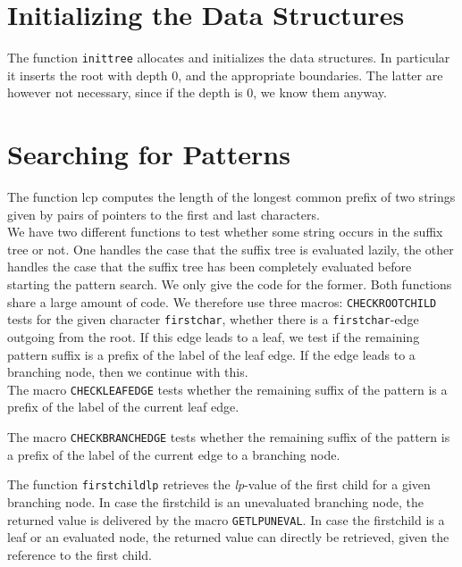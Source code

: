\documentclass[a4paper]{article}
\begin{document}
\section{Initializing the Data Structures}

The function \texttt{inittree} allocates and initializes the data structures.
In particular it inserts the root with depth 0, and the appropriate boundaries.
The latter are however not necessary, since if the depth is 0, we know them
anyway.

\section{Searching for Patterns}

The function lcp computes the length of the longest common prefix of two
strings given by pairs of pointers to the first and last characters.\\

We have two different functions to test whether some string occurs in the
suffix tree or not. One handles the case that the suffix tree is evaluated
lazily, the other handles the case that the suffix tree has been completely
evaluated before starting the pattern search. We only give the code for the
former. Both functions share a large amount of code. We therefore use three
macros: \texttt{CHECKROOTCHILD} tests for the given character
\texttt{firstchar}, whether there is a \texttt{firstchar}-edge outgoing from
the root. If this edge leads to a leaf, we test if the remaining pattern
suffix is a prefix of the label of the leaf edge. If the edge leads to a
branching node, then we continue with this.\\

The macro \texttt{CHECKLEAFEDGE} tests whether the remaining suffix of the
pattern is a prefix of the label of the current leaf edge.


The macro \texttt{CHECKBRANCHEDGE} tests whether the remaining suffix of the
pattern is a prefix of the label of the current edge to a branching node.

The function \texttt{firstchildlp} retrieves the \emph{lp}-value of the first child
for a given branching node. In case the firstchild is an unevaluated
branching node, the returned value is delivered by the macro
\texttt{GETLPUNEVAL}. In case the firstchild is a leaf or
an evaluated node, the returned value can directly be retrieved,
given the reference to the first child.
\end{document}

